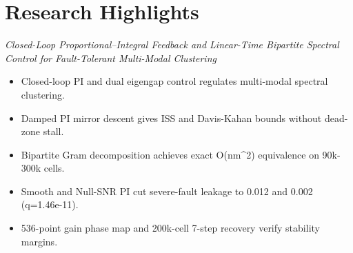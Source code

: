 \documentclass[11pt,letterpaper]{article}
\begin{document}
\section*{Research Highlights}
\textit{Closed-Loop Proportional--Integral Feedback and Linear-Time Bipartite Spectral Control for Fault-Tolerant Multi-Modal Clustering}

\begin{itemize}\setlength{\itemsep}{6pt}
    \item Closed-loop PI and dual eigengap control regulates multi-modal spectral clustering.
    \item Damped PI mirror descent gives ISS and Davis-Kahan bounds without dead-zone stall.
    \item Bipartite Gram decomposition achieves exact O(nm\^{}2) equivalence on 90k-300k cells.
    \item Smooth and Null-SNR PI cut severe-fault leakage to 0.012 and 0.002 (q=1.46e-11).
    \item 536-point gain phase map and 200k-cell 7-step recovery verify stability margins.
\end{itemize}
\end{document}
